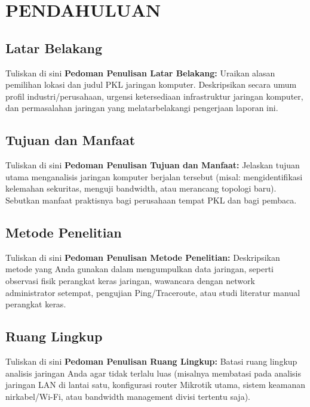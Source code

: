 \chapter{PENDAHULUAN}
\section{Latar Belakang}


Tuliskan di sini \textbf{Pedoman Penulisan Latar Belakang:} Uraikan alasan pemilihan lokasi dan judul PKL jaringan komputer. Deskripsikan secara umum profil industri/perusahaan, urgensi ketersediaan infrastruktur jaringan komputer, dan permasalahan jaringan yang melatarbelakangi pengerjaan laporan ini.


\section{Tujuan dan Manfaat}


Tuliskan di sini \textbf{Pedoman Penulisan Tujuan dan Manfaat:} Jelaskan tujuan utama menganalisis jaringan komputer berjalan tersebut (misal: mengidentifikasi kelemahan sekuritas, menguji bandwidth, atau merancang topologi baru). Sebutkan manfaat praktisnya bagi perusahaan tempat PKL dan bagi pembaca.


\section{Metode Penelitian}


Tuliskan di sini \textbf{Pedoman Penulisan Metode Penelitian:} Deskripsikan metode yang Anda gunakan dalam mengumpulkan data jaringan, seperti observasi fisik perangkat keras jaringan, wawancara dengan network administrator setempat, pengujian Ping/Traceroute, atau studi literatur manual perangkat keras.


\section{Ruang Lingkup}


Tuliskan di sini \textbf{Pedoman Penulisan Ruang Lingkup:} Batasi ruang lingkup analisis jaringan Anda agar tidak terlalu luas (misalnya membatasi pada analisis jaringan LAN di lantai satu, konfigurasi router Mikrotik utama, sistem keamanan nirkabel/Wi-Fi, atau bandwidth management divisi tertentu saja).

